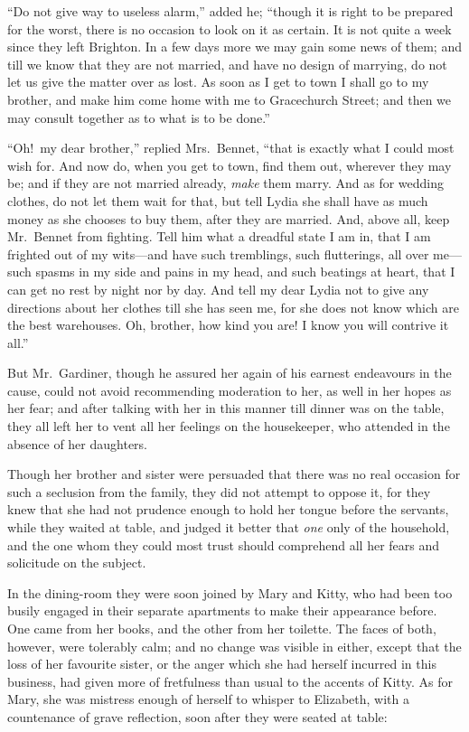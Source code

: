 \documentclass[12pt,english,oneside]{book}
\begin{document}
{}``Do not give way to useless alarm,'' added he; {}``though it
is right to be prepared for the worst, there is no occasion to look
on it as certain. It is not quite a week since they left Brighton.
In a few days more we may gain some news of them; and till we know
that they are not married, and have no design of marrying, do not
let us give the matter over as lost. As soon as I get to town I shall
go to my brother, and make him come home with me to Gracechurch Street;
and then we may consult together as to what is to be done.''

{}``Oh!\ my dear brother,'' replied Mrs.\ Bennet, {}``that is
exactly what I could most wish for. And now do, when you get to town,
find them out, wherever they may be; and if they are not married already,
\textit{make} them marry. And as for wedding clothes, do not let them
wait for that, but tell Lydia she shall have as much money as she
chooses to buy them, after they are married. And, above all, keep
Mr.\ Bennet from fighting. Tell him what a dreadful state I am in,
that I am frighted out of my wits\mbox{---}and have such tremblings,
such flutterings, all over me\mbox{---}such spasms in my side and
pains in my head, and such beatings at heart, that I can get no rest
by night nor by day. And tell my dear Lydia not to give any directions
about her clothes till she has seen me, for she does not know which
are the best warehouses. Oh, brother, how kind you are! I know you
will contrive it all.''

But Mr.\ Gardiner, though he assured her again of his earnest endeavours
in the cause, could not avoid recommending moderation to her, as well
in her hopes as her fear; and after talking with her in this manner
till dinner was on the table, they all left her to vent all her feelings
on the housekeeper, who attended in the absence of her daughters.

Though her brother and sister were persuaded that there was no real
occasion for such a seclusion from the family, they did not attempt
to oppose it, for they knew that she had not prudence enough to hold
her tongue before the servants, while they waited at table, and judged
it better that \textit{one} only of the household, and the one whom
they could most trust should comprehend all her fears and solicitude
on the subject.

In the dining-room they were soon joined by Mary and Kitty, who had
been too busily engaged in their separate apartments to make their
appearance before. One came from her books, and the other from her
toilette. The faces of both, however, were tolerably calm; and no
change was visible in either, except that the loss of her favourite
sister, or the anger which she had herself incurred in this business,
had given more of fretfulness than usual to the accents of Kitty.
As for Mary, she was mistress enough of herself to whisper to Elizabeth,
with a countenance of grave reflection, soon after they were seated
at table:
\end{document}
